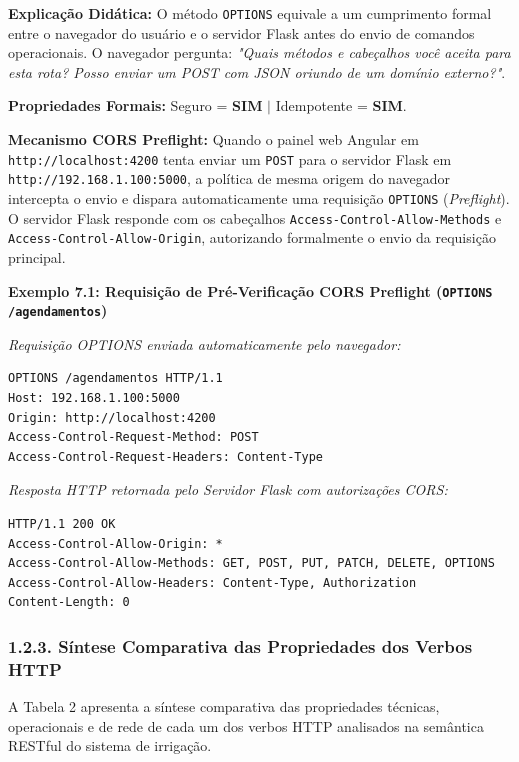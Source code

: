 \textbf{Explicação Didática:} O método \texttt{OPTIONS} equivale a um cumprimento formal entre o navegador do usuário e o servidor Flask antes do envio de comandos operacionais. O navegador pergunta: \textit{"Quais métodos e cabeçalhos você aceita para esta rota? Posso enviar um POST com JSON oriundo de um domínio externo?"}.

\textbf{Propriedades Formais:} Seguro = \textbf{SIM} $|$ Idempotente = \textbf{SIM}.

\textbf{Mecanismo CORS Preflight:} Quando o painel web Angular em \texttt{http://localhost:4200} tenta enviar um \texttt{POST} para o servidor Flask em \texttt{http://192.168.1.100:5000}, a política de mesma origem do navegador intercepta o envio e dispara automaticamente uma requisição \texttt{OPTIONS} (\textit{Preflight}). O servidor Flask responde com os cabeçalhos \texttt{Access-Control-Allow-Methods} e \texttt{Access-Control-Allow-Origin}, autorizando formalmente o envio da requisição principal.

\textbf{Exemplo 7.1: Requisição de Pré-Verificação CORS Preflight (\texttt{OPTIONS /agendamentos})}

\textit{Requisição OPTIONS enviada automaticamente pelo navegador:}
\begin{lstlisting}
OPTIONS /agendamentos HTTP/1.1
Host: 192.168.1.100:5000
Origin: http://localhost:4200
Access-Control-Request-Method: POST
Access-Control-Request-Headers: Content-Type

\end{lstlisting}

\textit{Resposta HTTP retornada pelo Servidor Flask com autorizações CORS:}
\begin{lstlisting}
HTTP/1.1 200 OK
Access-Control-Allow-Origin: *
Access-Control-Allow-Methods: GET, POST, PUT, PATCH, DELETE, OPTIONS
Access-Control-Allow-Headers: Content-Type, Authorization
Content-Length: 0

\end{lstlisting}

\subsubsection*{1.2.3. Síntese Comparativa das Propriedades dos Verbos HTTP}

A Tabela 2 apresenta a síntese comparativa das propriedades técnicas, operacionais e de rede de cada um dos verbos HTTP analisados na semântica RESTful do sistema de irrigação.

